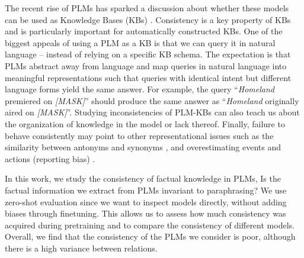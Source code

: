 The recent rise of PLMs has sparked a discussion about whether these models can be used as Knowledge Bases (KBs) \cite{lama,petroni2020how,davison2019commonsense,peters2019knowledge,alpaqa,roberts2020much}. 
Consistency is a key property of KBs and is particularly important for automatically constructed KBs. %
One of the biggest appeals of using a PLM as a KB is that we can
query it in natural language -- instead of relying on a specific KB schema.
The expectation is that PLMs abstract away from language and map queries in natural language into meaningful representations such that queries with identical intent but different language forms yield the same answer. 
For example, the query ``\textit{Homeland} premiered on \textit{[MASK]}'' should produce the same answer as ``\textit{Homeland} originally aired on \textit{[MASK]}''.
Studying inconsistencies of PLM-KBs can also teach us about the organization of knowledge in the model or lack thereof. 
Finally, failure to behave consistently may point
to other representational issues such as the similarity between antonyms and synonyms \cite{nguyen2016integrating}, and overestimating events and actions (reporting bias) \cite{shwartz2020neural}.


In this work, we study the consistency of factual knowledge
in PLMs,  Is the factual information we extract from PLMs invariant to paraphrasing? We use zero-shot evaluation since we want to inspect models directly, without adding biases through finetuning. This allows us to assess how much consistency was acquired during pretraining and to compare the consistency of different models. Overall, we find that the consistency of the PLMs we consider is poor, although there is a high variance between relations.



